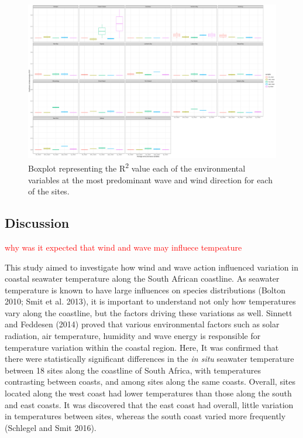 \documentclass[12pt,a4paper,]{article}
\begin{document}
\begin{figure}
\centering
\includegraphics{../figures/predominant_ww.pdf}
\caption{Boxplot representing the R\textsuperscript{2} value each of the
environmental variables at the most predominant wave and wind direction
for each of the sites.}
\end{figure}

\hypertarget{discussion}{%
\subsection{Discussion}\label{discussion}}

\textcolor{red}{why was it expected that wind and wave may influece tempeature}

This study aimed to investigate how wind and wave action influenced
variation in coastal seawater temperature along the South African
coastline. As seawater temperature is known to have large influences on
species distributions (Bolton 2010; Smit et al. 2013), it is important
to understand not only how temperatures vary along the coastline, but
the factors driving these variations as well. Sinnett and Feddesen
(2014) proved that various environmental factors such as solar
radiation, air temperature, humidity and wave energy is responsible for
temperature variation within the coastal region. Here, It was confirmed
that there were statistically significant differences in the \emph{in
situ} seawater temperature between 18 sites along the coastline of South
Africa, with temperatures contrasting between coasts, and among sites
along the same coasts. Overall, sites located along the west coast had
lower temperatures than those along the south and east coasts. It was
discovered that the east coast had overall, little variation in
temperatures between sites, whereas the south coast varied more
frequently (Schlegel and Smit 2016).
\end{document}
